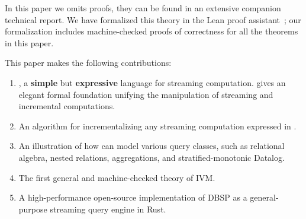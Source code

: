 In this paper we omits proofs, they can be found in an extensive
companion technical report.  We have formalized
this theory in the Lean proof
assistant~; our formalization includes
machine-checked proofs of correctness for all the theorems in this
paper.

This paper makes the following contributions:
\begin{enumerate}[nosep, leftmargin=0pt, itemindent=0.5cm, label=\textbf{(\arabic{*})}]
  \item \dbsp, a \textbf{simple} but \textbf{expressive} language for streaming
  computation. \dbsp gives an elegant formal foundation unifying the manipulation of
  streaming and incremental computations.
  \item An algorithm for incrementalizing any streaming computation expressed in
  \dbsp.
  \item An illustration of how \dbsp can model various query classes, such as relational algebra,
  nested relations, aggregations, and stratified-monotonic Datalog.
  \item The first general and machine-checked theory of IVM.
  \item A high-performance open-source implementation of DBSP as a
  general-purpose streaming query engine in Rust.
\end{enumerate}
